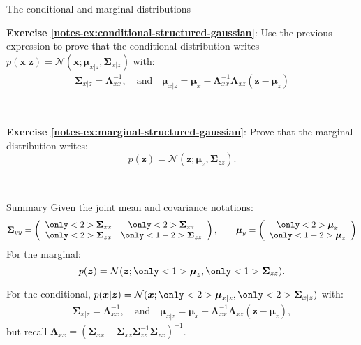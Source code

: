 \documentclass{beamer}
\newcommand{\MN}{{\mathcal N}}
\newcommand{\bs}[1]{\boldsymbol{#1}}
\newcommand{\exercise}[2]{\noindent\colorbox{blue!10}{\parbox{0.995\textwidth}{\textbf{Exercise \ref{notes-ex:#1}}: #2}}\\}
\newcommand{\oncolor}[2]{\only<#1>{\color{#2}}}
\begin{document}
\begin{frame}{The conditional and marginal distributions}
\exercise{conditional-structured-gaussian}{Use the previous expression to prove that the conditional distribution writes $p(\bs{x}|\bs{z})= \MN(\bs{x};\bs{\mu}_{x|z},\bs{\Sigma}_{x|z})$ with:
\begin{align*} 
\bs{\Sigma}_{x|z} = \bs{\Lambda}_{xx}^{-1}, \quad\text{and}\quad \bs{\mu}_{x|z} = \boldsymbol{\mu}_{x} - \bs{\Lambda}_{xx}^{-1}\bs{\Lambda}_{xz}(\bs{z}-\boldsymbol{\mu}_{z}) 
\end{align*} 
}\vspace{3mm}

\exercise{marginal-structured-gaussian}{Prove that the marginal distribution writes:
\begin{equation*}
 p(\bs{z}) = \MN(\bs{z};\bs{\mu}_{z},\bs{\Sigma}_{zz}).
\end{equation*}
}

\end{frame}

\begin{frame}{Summary}
Given the joint mean and covariance notations:
\[\bs{\Sigma}_{yy} = \left(\begin{array}{cc} {\oncolor{2}{orange}\bs{\Sigma}_{xx}} & {\oncolor{2}{orange}\bs{\Sigma}_{xz}} \\ {\oncolor{2}{orange}\bs{\Sigma}_{zx}} & {\oncolor{1-2}{orange}\bs{\Sigma}_{zz}} \end{array}\right), \qquad \bs{\mu}_{y}=\left(\begin{array}{c} {\oncolor{2}{orange}\bs{\mu}_x} \\ {\oncolor{1-2}{orange}\bs{\mu}_z}\end{array}\right) \]
For the marginal:
\[
 p(\bs{z}) = \MN(\bs{z};{\oncolor{1}{orange}\bs{\mu}_{z}},{\oncolor{1}{orange}\bs{\Sigma}_{zz}}).
\]\pause 

For the conditional, $p(\bs{x}|\bs{z})= \MN(\bs{x};{\oncolor{2}{orange}\bs{\mu}_{x|z}},{\oncolor{2}{orange}\bs{\Sigma}_{x|z}})$ with:
\begin{align*} 
\bs{\Sigma}_{x|z} = \bs{\Lambda}_{xx}^{-1}, \quad\text{and}\quad \bs{\mu}_{x|z} = \boldsymbol{\mu}_{x} - \bs{\Lambda}_{xx}^{-1}\bs{\Lambda}_{xz}(\bs{z}-\boldsymbol{\mu}_{z}),
\end{align*} 
but recall $\bs{\Lambda}_{xx} = (\bs{\Sigma}_{xx} - \bs{\Sigma}_{xz}\bs{\Sigma}_{zz}^{-1}\bs{\Sigma}_{zx})^{-1}$.

\end{frame}
\end{document}
